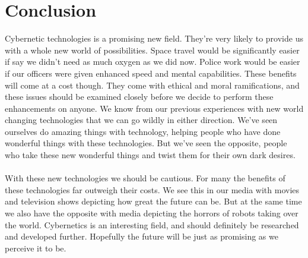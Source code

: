 \documentclass[12pt,a4paper,notitlepage]{article}
\begin{document}
\section{Conclusion}
Cybernetic technologies is a promising new field. They're very likely to provide
us with a whole new world of possibilities. Space travel would be significantly
easier if say we didn't need as much oxygen as we did now. Police work would be
easier if our officers were given enhanced speed and mental capabilities. These
benefits will come at a cost though. They come with ethical and moral
ramifications, and these issues should be examined closely before we decide to
perform these enhancements on anyone. We know from our previous experiences with
new world changing technologies that we can go wildly in either direction. We've
seen ourselves do amazing things with technology, helping people who have done
wonderful things with these technologies. But we've seen the opposite, people
who take these new wonderful things and twist them for their own dark desires.
\\\\
With these new technologies we should be cautious. For many the benefits of
these technologies far outweigh their costs. We see this in our media with
movies and television shows depicting how great the future can be. But at the
same time we also have the opposite with media depicting the horrors of robots
taking over the world. Cybernetics is an interesting field, and should
definitely be researched and developed further. Hopefully the future will be
just as promising as we perceive it to be.
\end{document}
